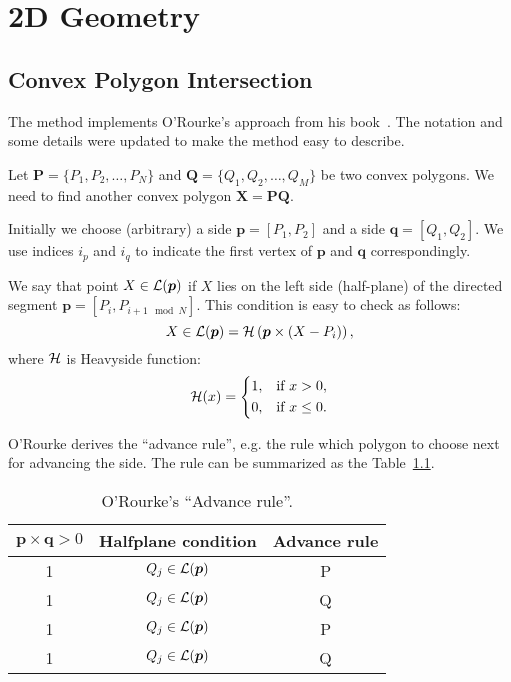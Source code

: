 
\chapter{2D Geometry}\label{ch:geometry2d}

\section{Convex Polygon Intersection}

The method implements O'Rourke's approach from his
book~\cite{bib:orourke}. The notation and some details were updated to
make the method easy to describe.

Let $\bm{P}=\{P_1,P_2,\dots,P_N\}$ and $\bm{Q}=\{Q_1,Q_2,\dots,Q_M\}$
be two convex polygons. We need to find another convex polygon
$\bm{X}=\bm{P}\bm{Q}$.

Initially we choose (arbitrary) a side $\bm{p}=[P_1,P_2]$ and a side
$\bm{q}=[Q_1,Q_2]$. We use indices $i_p$ and $i_q$ to indicate the
first vertex of $\bm{p}$ and $\bm{q}$ correspondingly. 

We say that point $X\in {\cal L}(\bm{p})$ if $X$ lies on the left side
(half-plane) of the directed segment $\bm{p}=[P_i,P_{i+1\mod N}]$. This
condition is easy to check as follows:
\begin{equation}
  X \in {\cal L}(\bm{p}) = {\cal H}\left( { \bm{p} \times (X-P_i)
  }\right),
\end{equation}
where ${\cal H}$ is Heavyside function:
\begin{equation}
  {\cal H}(x) = \left\{
  \begin{aligned}
    1, &\quad \text{if}\,\,x > 0,\\
    0, &\quad  \text{if}\,\,x \le 0.\\
  \end{aligned}\right.
\end{equation}

O'Rourke derives the ``advance rule'', e.g. the rule which polygon to
choose next for advancing the side. The rule can be summarized as the
Table~\ref{tab:arule}.
%
\begin{table}
  \center
  \caption{O'Rourke's ``Advance rule''.}
  \begin{tabular}{c|c|c}
    \hline
    $\bm{p}\times\bm{q} > 0$ & Halfplane condition & Advance rule \\
    \hline
    1 & $Q_j\in {\cal L}(\bm{p})$ & P \\
    1 & $Q_j\in {\cal L}(\bm{p})$ & Q \\
    \hline
    1 & $Q_j\in {\cal L}(\bm{p})$ & P \\
    1 & $Q_j\in {\cal L}(\bm{p})$ & Q \\
    \hline
  \end{tabular}
  \label{tab:arule}
\end{table}
